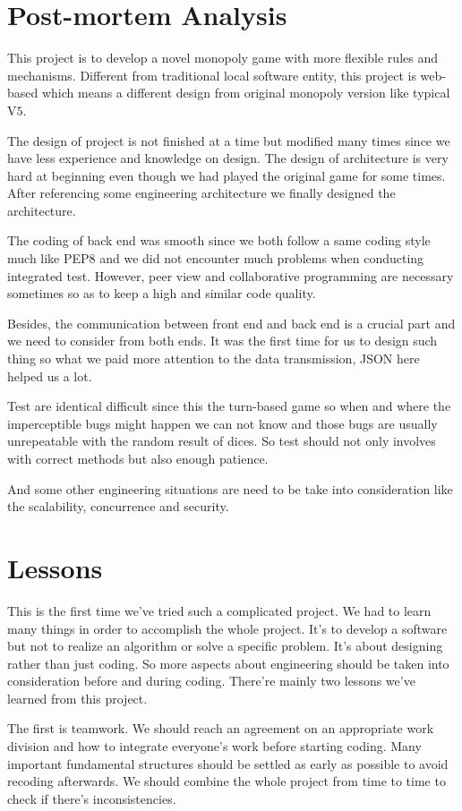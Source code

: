 \documentclass[a4paper,11pt]{article}
\begin{document}
\section{Post-mortem Analysis}
This project is to develop a novel monopoly game with more flexible rules and mechanisms. Different from traditional local software entity, this project is web-based which means a different design from original monopoly version like typical V$5$. 

The design of project is not finished at a time but modified many times since we have less experience and knowledge on design. The design of architecture is very hard at beginning even though we had played the original game for some times. After referencing some engineering architecture we finally designed the architecture.

The coding of back end was smooth since we both follow a same coding style much like PEP$8$ and we did not encounter much problems when conducting integrated test. However, peer view and collaborative programming are necessary sometimes so as to keep a high and similar code quality.

Besides, the communication between front end and back end is a crucial part and we need to consider from both ends. It was the first time for us to design such thing so what we paid more attention to the data transmission, JSON here helped us a lot.

Test are identical difficult since this the turn-based game so when and where the imperceptible bugs might happen we can not know and those bugs are usually unrepeatable with the random result of dices. So test should not only involves with correct methods but also enough patience.

And some other engineering situations are need to be take into consideration like the scalability, concurrence and security.
\section{Lessons}
This is the first time we've tried such a complicated project. We had to learn many things in order to accomplish the whole project. It's to develop a software but not to realize an algorithm or solve a specific problem. It's about designing rather than just coding. So more aspects about engineering should be taken into consideration before and during coding. There're mainly two lessons we've learned from this project. 

The first is teamwork. We should reach an agreement on an appropriate work division and how to integrate everyone's work before starting coding. Many important fundamental structures should be settled as early as possible to avoid recoding afterwards. We should combine the whole project from time to time to check if there's inconsistencies.
\end{document}
